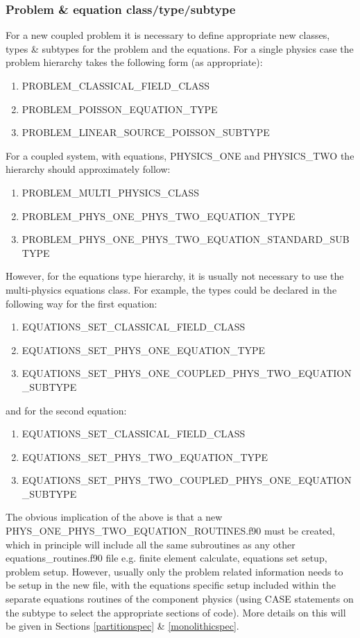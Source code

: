 \subsubsection{Problem \& equation class/type/subtype}

For a new coupled problem it is necessary to define appropriate new classes, types \& subtypes for the problem and the equations. For a single physics case the problem hierarchy takes the following form (as appropriate):
\begin{enumerate}
 \item PROBLEM\_CLASSICAL\_FIELD\_CLASS
 \item PROBLEM\_POISSON\_EQUATION\_TYPE
 \item PROBLEM\_LINEAR\_SOURCE\_POISSON\_SUBTYPE
\end{enumerate}
For a coupled system, with equations, PHYSICS\_ONE and PHYSICS\_TWO the hierarchy should approximately follow:
\begin{enumerate}
 \item PROBLEM\_MULTI\_PHYSICS\_CLASS
 \item PROBLEM\_PHYS\_ONE\_PHYS\_TWO\_EQUATION\_TYPE
 \item PROBLEM\_PHYS\_ONE\_PHYS\_TWO\_EQUATION\_STANDARD\_SUBTYPE
\end{enumerate}

However, for the equations type hierarchy, it is usually not necessary to use the multi-physics equations class. For example, the types could be declared in the following way for the first equation:
\begin{enumerate}
 \item EQUATIONS\_SET\_CLASSICAL\_FIELD\_CLASS
 \item EQUATIONS\_SET\_PHYS\_ONE\_EQUATION\_TYPE
 \item EQUATIONS\_SET\_PHYS\_ONE\_COUPLED\_PHYS\_TWO\_EQUATION\_SUBTYPE
\end{enumerate}
and for the second equation:
\begin{enumerate}
 \item EQUATIONS\_SET\_CLASSICAL\_FIELD\_CLASS
 \item EQUATIONS\_SET\_PHYS\_TWO\_EQUATION\_TYPE
 \item EQUATIONS\_SET\_PHYS\_TWO\_COUPLED\_PHYS\_ONE\_EQUATION\_SUBTYPE
\end{enumerate}

The obvious implication of the above is that a new PHYS\_ONE\_PHYS\_TWO\_EQUATION\_ROUTINES.f90 must be created, which in principle will include all the same subroutines as any other equations\_routines.f90 file e.g. finite element calculate, equations set setup, problem setup. However, usually only the problem related information needs to be setup in the new file, with the equations specific setup included within the separate equations routines of the component physics (using CASE statements on the subtype to select the appropriate sections of code). More details on this will be given in Sections \ref{partitionspec} \& \ref{monolithicspec}.

